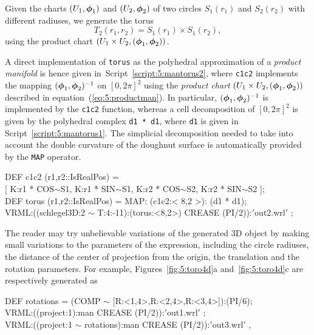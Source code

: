 \documentclass{31x47jw}
\begin{document}
    
\begin{example}
Given the charts $(U_{1},{\mbox{\boldmath $\phi$}}_{1})$ and $(U_{2},{\mbox{\boldmath $\phi$}}_{2})$ of two
circles $S_{1}(r_{1})$ and $S_{2}(r_{2})$ with different radiuses, we 
generate the torus 
\[
T_{2}(r_{1},r_{2}) = S_{1}(r_{1}) \times S_{1}(r_{2}),
\]
using the product chart $(U_{1}\times U_{2}, ({\mbox{\boldmath $\phi$}}_{1},{\mbox{\boldmath $\phi$}}_{2}))$.
    
A direct implementation of \texttt{torus} as the polyhedral
approximation of a \emph{product manifold} is hence given
in~Script~\ref{script:5:mantorus2}, where \texttt{c1c2} implements the
mapping $({\mbox{\boldmath $\phi$}}_{1},{\mbox{\boldmath $\phi$}}_{2})^{-1}$ on $[0,2\pi]^{2}$ using the
\emph{product chart} $(U_{1}\times U_{2}, ({\mbox{\boldmath $\phi$}}_{1},{\mbox{\boldmath $\phi$}}_{2}))$
described in equation~(\ref{eq:5:productman}).  In particular,
$({\mbox{\boldmath $\phi$}}_{1},{\mbox{\boldmath $\phi$}}_{2})^{-1}$ is implemented by the \texttt{c1c2}
function, whereas a cell decomposition of $[0,2\pi]^{2}$ is given by
the polyhedral complex \texttt{d1 * d1}, where \texttt{d1} is given in
Script~\ref{script:5:mantorus1}.  The simplicial decomposition needed
to take into account the double curvature of the doughnut surface is
automatically provided by the \texttt{MAP} operator.

\begin{script}
\begin{smallplasm} 
DEF c1c2 (r1,r2::IsRealPos) = \+\\{}
[ K:r1 * COS$\sim$S1, K:r1 * SIN$\sim$S1, 
K:r2 * COS$\sim$S2, K:r2 * SIN$\sim$S2 ];\-\\
DEF torus  (r1,r2::IsRealPos) = MAP: (c1c2:< 8,2 >): (d1 * d1);\\[0.3cm]

VRML:((schlegel3D:2  $\sim$  T:4:-11):(torus:<8,2>) CREASE (PI/2)):$'$out2.wrl$'$ ;
\end{smallplasm} 
\label{script:5:mantorus2}
\end{script}

The reader may try unbelievable variations of the generated 3D
object by making small variations to the parameters of the expression,
including the circle radiuses, the distance of the center of
projection from the origin, the translation and the rotation
parameters.  For example,  Figures~\ref{fig:5:toro4d}a
and~\ref{fig:5:toro4d}c are respectively generated as

\begin{smallplasm} 
DEF rotations = (COMP $\sim$ [R:<1,4>,R:<2,4>,R:<3,4>]):(PI/6);\\
VRML:((project:1):man CREASE (PI/2)):$'$out1.wrl$'$ ;\\
VRML:((project:1  $\sim$  rotations):man CREASE (PI/2)):$'$out3.wrl$'$ ,
\end{smallplasm} 



\end{example}
\end{document}
